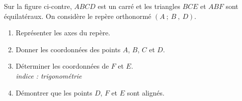 \documentclass[main.tex]{subfiles}
\begin{document}
\begin{exercise}\hfill 

\noindent Sur la figure ci-contre, $ABCD$ est un carré et les triangles $BCE$ et $ABF$ sont équilatéraux. On considère le repère orthonormé $(A~;~B~,~D)$.\\
\noindent\parbox{0.55\linewidth}{ 
\begin{enumerate}[label=\arabic*),leftmargin=*]
\item Représenter les axes du repère.
\item Donner les coordonnées des points $A$, $B$, $C$ et $D$.
\item Déterminer les coordonnées de $F$ et $E$.\\
\noindent  \emph{indice : trigonométrie} 
\item Démontrer que les points $D$, $F$ et $E$ sont alignés.
\end{enumerate}   
}
\parbox{0.4\linewidth}{
}
\end{exercise}
%
\newpage 
\end{document}
